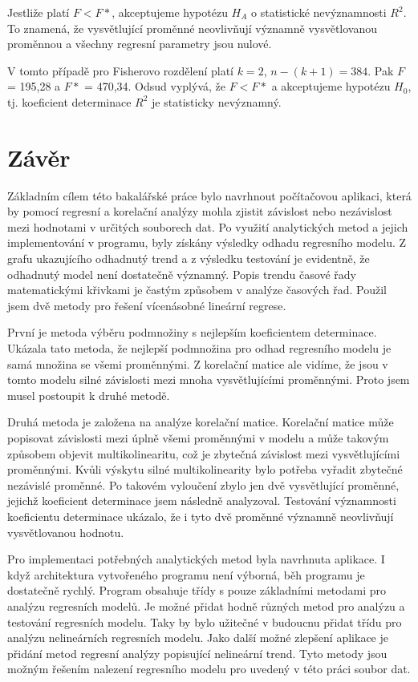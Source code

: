 \documentclass[a4paper,12pt,twoside]{scrreprt}
\begin{document}
Jestliže platí $F < F*$, akceptujeme hypotézu $H_A$ o statistické nevýznamnosti $R^2$. To znamená, že vysvětlující proměnné neovlivňují významně vysvětlovanou proměnnou a všechny regresní parametry jsou nulové.

V tomto případě pro Fisherovo rozdělení platí $k = 2$, $n-(k+1) = 384$. Pak \space\space\space $F$ = 195,28 a $F*$ = 470,34. Odsud vyplývá, že $F < F*$ a akceptujeme hypotézu $H_0$, tj. koeficient determinace $R^2$ je statisticky nevýznamný.  
 


\chapter*{Závěr}

Základním cílem této bakalářské práce bylo navrhnout počítačovou aplikaci, která by pomocí regresní a korelační analýzy mohla zjistit závislost nebo nezávislost mezi hodnotami v určitých souborech dat. Po využití analytických metod a jejich implementování v programu, byly získány výsledky odhadu regresního modelu. Z grafu ukazujícího odhadnutý trend a z výsledku testování je evidentně, že odhadnutý model není dostatečně významný. Popis trendu časové řady matematickými křivkami je častým způsobem v analýze časových řad. Použil jsem dvě metody pro řešení vícenásobné lineární regrese. 

První je metoda výběru podmnožiny s nejlepším koeficientem determinace. Ukázala tato metoda, že nejlepší podmnožina pro odhad regresního modelu je samá množina se všemi proměnnými. Z korelační matice ale vidíme, že jsou v tomto modelu silné závislosti mezi mnoha vysvětlujícími proměnnými. Proto jsem musel postoupit k druhé metodě. 

Druhá metoda je založena na analýze korelační matice. Korelační matice může popisovat závislosti mezi úplně všemi proměnnými v modelu a může takovým způsobem objevit multikolinearitu, což je zbytečná závislost mezi vysvětlujícími proměnnými. Kvůli výskytu silné multikolinearity bylo potřeba vyřadit zbytečné nezávislé proměnné. Po takovém vyloučení zbylo jen dvě vysvětlující proměnné, jejichž koeficient determinace jsem následně analyzoval. Testování významnosti koeficientu determinace ukázalo, že i tyto dvě proměnné významně neovlivňují vysvětlovanou hodnotu. 

Pro implementaci potřebných analytických metod byla navrhnuta aplikace. I když architektura vytvořeného programu není výborná, běh programu je dostatečně rychlý. Program obsahuje třídy s pouze základními metodami pro analýzu regresních modelů. Je možné přidat hodně různých metod pro analýzu a testování regresních modelu. Taky by bylo užitečné v budoucnu přidat třídu pro analýzu nelineárních regresních modelu. Jako další možné zlepšení aplikace je přidání metod regresní analýzy popisující nelineární trend. Tyto metody jsou možným řešením nalezení regresního modelu pro uvedený v této práci soubor dat. 
\end{document}
